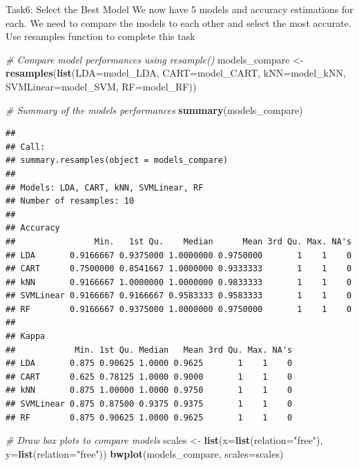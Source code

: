 \documentclass[
]{article}
\newenvironment{Shaded}{\begin{snugshade}}{\end{snugshade}}
\newcommand{\AttributeTok}[1]{\textcolor[rgb]{0.13,0.29,0.53}{#1}}
\newcommand{\CommentTok}[1]{\textcolor[rgb]{0.56,0.35,0.01}{\textit{#1}}}
\newcommand{\FunctionTok}[1]{\textcolor[rgb]{0.13,0.29,0.53}{\textbf{#1}}}
\newcommand{\NormalTok}[1]{#1}
\newcommand{\OtherTok}[1]{\textcolor[rgb]{0.56,0.35,0.01}{#1}}
\newcommand{\StringTok}[1]{\textcolor[rgb]{0.31,0.60,0.02}{#1}}
\begin{document}
Task6: Select the Best Model We now have 5 models and accuracy
estimations for each. We need to compare the models to each other and
select the most accurate. Use resamples function to complete this task

\begin{Shaded}
\begin{Highlighting}[]
\CommentTok{\# Compare model performances using resample()}
\NormalTok{models\_compare }\OtherTok{\textless{}{-}} \FunctionTok{resamples}\NormalTok{(}\FunctionTok{list}\NormalTok{(}\AttributeTok{LDA=}\NormalTok{model\_LDA, }\AttributeTok{CART=}\NormalTok{model\_CART, }\AttributeTok{kNN=}\NormalTok{model\_kNN, }\AttributeTok{SVMLinear=}\NormalTok{model\_SVM, }\AttributeTok{RF=}\NormalTok{model\_RF))}

\CommentTok{\# Summary of the models performances}
\FunctionTok{summary}\NormalTok{(models\_compare)}
\end{Highlighting}
\end{Shaded}

\begin{verbatim}
## 
## Call:
## summary.resamples(object = models_compare)
## 
## Models: LDA, CART, kNN, SVMLinear, RF 
## Number of resamples: 10 
## 
## Accuracy 
##                Min.   1st Qu.    Median      Mean 3rd Qu. Max. NA's
## LDA       0.9166667 0.9375000 1.0000000 0.9750000       1    1    0
## CART      0.7500000 0.8541667 1.0000000 0.9333333       1    1    0
## kNN       0.9166667 1.0000000 1.0000000 0.9833333       1    1    0
## SVMLinear 0.9166667 0.9166667 0.9583333 0.9583333       1    1    0
## RF        0.9166667 0.9375000 1.0000000 0.9750000       1    1    0
## 
## Kappa 
##            Min. 1st Qu. Median   Mean 3rd Qu. Max. NA's
## LDA       0.875 0.90625 1.0000 0.9625       1    1    0
## CART      0.625 0.78125 1.0000 0.9000       1    1    0
## kNN       0.875 1.00000 1.0000 0.9750       1    1    0
## SVMLinear 0.875 0.87500 0.9375 0.9375       1    1    0
## RF        0.875 0.90625 1.0000 0.9625       1    1    0
\end{verbatim}

\begin{Shaded}
\begin{Highlighting}[]
\CommentTok{\# Draw box plots to compare models}
\NormalTok{scales }\OtherTok{\textless{}{-}} \FunctionTok{list}\NormalTok{(}\AttributeTok{x=}\FunctionTok{list}\NormalTok{(}\AttributeTok{relation=}\StringTok{"free"}\NormalTok{), }\AttributeTok{y=}\FunctionTok{list}\NormalTok{(}\AttributeTok{relation=}\StringTok{"free"}\NormalTok{))}
\FunctionTok{bwplot}\NormalTok{(models\_compare, }\AttributeTok{scales=}\NormalTok{scales)}
\end{Highlighting}
\end{Shaded}
\end{document}
